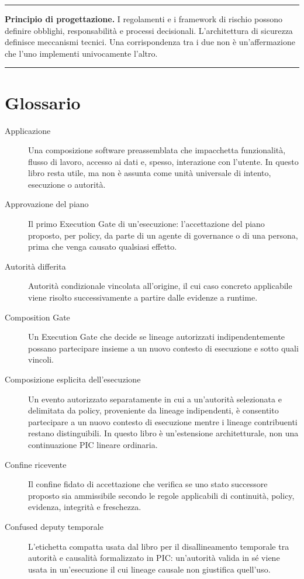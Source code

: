 \documentclass[10pt,oneside,openany]{book}
\newcommand{\principle}[1]{%
  \vspace{4pt}
  \noindent\begin{minipage}{\linewidth}
  \hrule\vspace{5pt}
  \small\sffamily\raggedright\textbf{Principio di progettazione.} #1
  \vspace{5pt}\hrule
  \end{minipage}\vspace{4pt}
}
\begin{document}
\principle{I regolamenti e i framework di rischio possono definire obblighi, responsabilità e processi decisionali. L'architettura di sicurezza definisce meccanismi tecnici. Una corrispondenza tra i due non è un'affermazione che l'uno implementi univocamente l'altro.}

\clearpage

\backmatter

\chapter*{Glossario}

\begin{description}
\item[Applicazione] Una composizione software preassemblata che impacchetta funzionalità, flusso di lavoro, accesso ai dati e, spesso, interazione con l'utente. In questo libro resta utile, ma non è assunta come unità universale di intento, esecuzione o autorità.
\item[Approvazione del piano] Il primo Execution Gate di un'esecuzione: l'accettazione del piano proposto, per policy, da parte di un agente di governance o di una persona, prima che venga causato qualsiasi effetto.
\item[Autorità differita] Autorità condizionale vincolata all'origine, il cui caso concreto applicabile viene risolto successivamente a partire dalle evidenze a runtime.
\item[Composition Gate] Un Execution Gate che decide se lineage autorizzati indipendentemente possano partecipare insieme a un nuovo contesto di esecuzione e sotto quali vincoli.
\item[Composizione esplicita dell'esecuzione] Un evento autorizzato separatamente in cui a un'autorità selezionata e delimitata da policy, proveniente da lineage indipendenti, è consentito partecipare a un nuovo contesto di esecuzione mentre i lineage contribuenti restano distinguibili. In questo libro è un'estensione architetturale, non una continuazione PIC lineare ordinaria.
\item[Confine ricevente] Il confine fidato di accettazione che verifica se uno stato successore proposto sia ammissibile secondo le regole applicabili di continuità, policy, evidenza, integrità e freschezza.
\item[Confused deputy temporale] L'etichetta compatta usata dal libro per il disallineamento temporale tra autorità e causalità formalizzato in PIC: un'autorità valida in sé viene usata in un'esecuzione il cui lineage causale non giustifica quell'uso.

\end{description}
\end{document}
